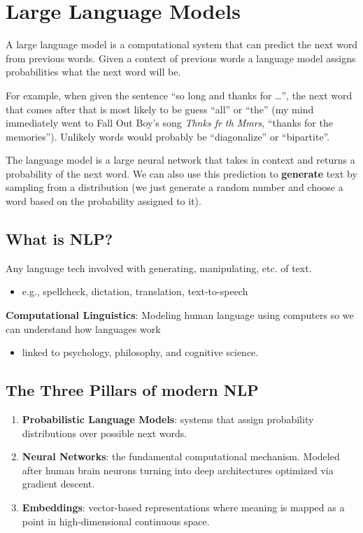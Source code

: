 \documentclass[11pt]{article}
\begin{document}
 \raggedright

\section{Large Language Models}

A large language model is a computational system that can predict the next word
from previous words. Given a context of previous words a language model assigns
probabilities what the next word will be.

For example, when given the sentence ``so long and thanks for \ldots'', the next
word that comes after that is most likely to be guess ``all'' or ``the'' (my
mind immediately went to Fall Out Boy's song \textit{Thnks fr th Mmrs}, ``thanks
for the memories''). Unlikely words would probably be ``diagonalize'' or
``bipartite''.

The language model is a large neural network that takes in context and returns a
probability of the next word. We can also use this prediction to
\textbf{generate} text by sampling from a distribution (we just generate a
random number and choose a word based on the probability assigned to it).

\subsection{What is NLP?}

Any language tech involved with generating, manipulating, etc. of text.

\begin{itemize}
	\item e.g., spellcheck, dictation, translation, text-to-speech

\end{itemize}

\textbf{Computational Linguistics}: Modeling human language using computers so
we can understand how languages work

\begin{itemize}
	\item linked to psychology, philosophy, and cognitive science.
\end{itemize}

\subsection{The Three Pillars of modern NLP}

\begin{enumerate}
	\item \textbf{Probabilistic Language Models}: systems that assign probability
	      distributions over possible next words.
	\item \textbf{Neural Networks}: the fundamental computational mechanism.
	      Modeled after human brain neurons turning into deep architectures
	      optimized via gradient descent.
	\item \textbf{Embeddings}: vector-based representations where meaning is
	      mapped as a point in high-dimensional continuous space.
\end{enumerate}
\end{document}
